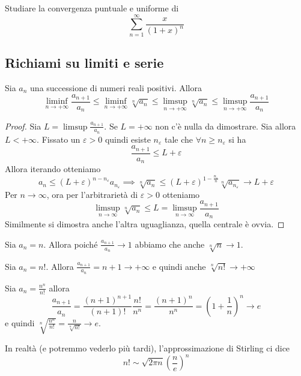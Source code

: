 \begin{example}
    Studiare la convergenza puntuale e uniforme di
    \[
        \sum_{n=1}^{\infty} \frac{x}{{(1+x)}^{n}} 
    \]
\end{example}

\subsection{Richiami su limiti e serie}
\begin{proposition}
    Sia \(a_{n}\) una successione di numeri reali positivi. Allora 
    \[
       \liminf_{n \to +\infty} \frac{a_{n+1}}{ a_{n} } \le \liminf_{n \to
       +\infty} \sqrt[n]{a_{n}} \le \limsup_{n \to +\infty} \sqrt[n]{a_{n}} \le
       \limsup_{n \to +\infty} \frac{a_{n+1}}{a_{n}}
    \]
\end{proposition}
\begin{proof}
    Sia \(L = \limsup \frac{a_{n+1}}{a_{n}}\). Se \(L=+\infty\) non c'è nulla da
    dimostrare. Sia allora \( L < +\infty\). Fissato un \(\varepsilon>0\) quindi
    esiste \(n_{\varepsilon} \) tale che \(\forall n \ge n_{\varepsilon}\) si ha 
    \[
        \frac{a_{n+1} }{a_{n}} \le  L + \varepsilon
    \]
    Allora iterando otteniamo
    \[
        a_{n} \le (L + \varepsilon)^{n - n_{\varepsilon}} a_{n_{\varepsilon}}
        \implies \sqrt[n]{a_{n}} \le {(L + \varepsilon)}^{1 -
        \frac{n_{\varepsilon}}{n}} \sqrt[n]{a_{n_{\varepsilon}}} \to L +
        \varepsilon 
    \]
    Per \(n \to \infty\), ora per l'arbitrarietà di \(\varepsilon > 0\)
    otteniamo
    \[
        \limsup_{n \to \infty} \sqrt[n]{a_{n}} \le L = \limsup_{n \to \infty}
        \frac{a_{n+1}}{a_{n}}
    \]
    Similmente si dimostra anche l'altra uguaglianza, quella centrale è ovvia.
\end{proof}
\begin{example}
    Sia \(a_{n} = n\). Allora poiché \(\frac{a_{n+1}}{a_{n}} \to 1\) abbiamo che
    anche \(\sqrt[n]{n} \to 1\).

    Sia \(a_{n} = n!\). Allora \(\frac{a_{n+1}}{a_{n}} = n+1 \to +\infty\) e
    quindi anche \(\sqrt[n]{n!} \to +\infty\)

    Sia \(a_{n} = \frac{n^{n}}{n!}\) allora
    \[
        \frac{a_{n+1}}{a_{n}} = \frac{{(n+1)}^{n+1}}{(n+1)!} \frac{n!}{n^{n}} =
        \frac{{(n+1)}^{n}}{n^{n}} = {\left( 1 + \frac{1}{n} \right)}^{n} \to e
    \]
    e quindi \(\displaystyle \sqrt[n]{\frac{n^{n}}{n!}} =
    \frac{n}{\sqrt[n]{n!}}\to e\).

\end{example}
\begin{remark}
    In realtà (e potremmo vederlo più tardi), l'approssimazione di Stirling ci
    dice
    \[
    n! \sim \sqrt{2\pi n} {\left( \frac{n}{e} \right)}^{n}
    \]
\end{remark}

